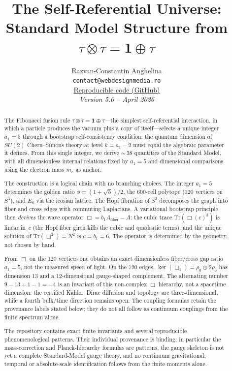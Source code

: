 \documentclass[12pt,a4paper]{article}
\title{\textbf{The Self-Referential Universe:\\
Standard Model Structure from $\tau \otimes \tau = \mathbf{1} \oplus \tau$}}
\author{
Razvan-Constantin Anghelina\\
\texttt{contact@webdesignmedia.ro}\\[0.3em]
\href{https://github.com/razvananghelina/One-Integer-Three-Generations}{Reproducible code (GitHub)}\\[1em]
\textit{Version 5.0 -- April 2026}
}
\date{}
\theoremstyle{definition}
\begin{document}
\maketitle

\begin{abstract}
The Fibonacci fusion rule $\tau \otimes \tau = \mathbf{1} \oplus \tau$---the simplest self-referential interaction, in which a particle produces the vacuum plus a copy of itself---selects a unique integer $a_1 = 5$ through a bootstrap self-consistency condition: the quantum dimension of $SU(2)$ Chern--Simons theory at level $k = a_1 - 2$ must equal the algebraic parameter it defines.  From this single integer, we derive ${\sim}\,38$ quantities of the Standard Model, with all dimensionless internal relations fixed by $a_1 = 5$ and dimensional comparisons using the electron mass $m_e$ as anchor.

The construction is a logical chain with no branching choices.  The integer $a_1 = 5$ determines the golden ratio $\phi = (1+\sqrt{5})/2$, the 600-cell polytope ($120$ vertices on $S^3$), and $E_8$ via the icosian lattice.  The Hopf fibration of $S^3$ decomposes the graph into fiber and cross edges with commuting Laplacians.  A variational bootstrap principle then \emph{derives} the wave operator $\Box = b_1 A_{\mathrm{fiber}} - A$: the cubic trace $\mathrm{Tr}(\Box(c)^3)$ is linear in~$c$ (the Hopf fiber girth kills the cubic and quadratic terms), and the unique solution of $\mathrm{Tr}(\Box^3) = N^2$ is $c = b_1 = 6$.  The operator is determined by the geometry, not chosen by hand.

From $\Box$ on the 120 vertices one obtains an exact dimensionless fiber/cross
gap ratio $a_1=5$, not the measured speed of light.  On the 720 edges,
$\ker(\Box_1)=\rho_0\oplus2\rho_5$ has dimension 13 and a 12-dimensional
gauge-shaped complement.  The alternating number
$9-13+1-1=-4$ is an invariant of this non-complex $\Box$ hierarchy, not a
spacetime dimension: the certified Kähler--Dirac diffusion and topology are
three-dimensional, while a fourth bulk/time direction remains open.  The
coupling formulas retain the provenance labels stated below; they do not all
follow as continuum couplings from the finite spectrum alone.

The repository contains exact finite invariants and several reproducible
phenomenological patterns.  Their individual provenance is binding: in
particular the mass-correction and Planck-hierarchy formulas are patterns, the
gauge skeleton is not yet a complete Standard-Model gauge theory, and no
continuum gravitational, temporal or absolute-scale identification follows
from the finite moments alone.


\end{abstract}
\end{document}
